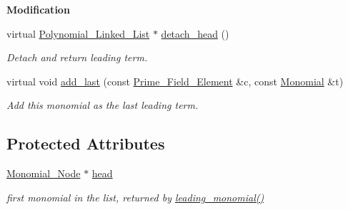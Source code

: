 \begin{Indent}\textbf{ Modification}\par
\begin{DoxyCompactItemize}
\item 
\mbox{\label{class_polynomial___linked___list_ad840ddaceb40cda7156a51a6882f9462}} 
virtual \hyperlink{class_polynomial___linked___list}{Polynomial\+\_\+\+Linked\+\_\+\+List} $\ast$ \hyperlink{class_polynomial___linked___list_ad840ddaceb40cda7156a51a6882f9462}{detach\+\_\+head} ()
\begin{DoxyCompactList}\small\item\em Detach and return leading term. \end{DoxyCompactList}\item 
\mbox{\label{class_polynomial___linked___list_a18b4928906ac8e5dafe3c93fe30dab61}} 
virtual void \hyperlink{class_polynomial___linked___list_a18b4928906ac8e5dafe3c93fe30dab61}{add\+\_\+last} (const \hyperlink{class_prime___field___element}{Prime\+\_\+\+Field\+\_\+\+Element} \&c, const \hyperlink{class_monomial}{Monomial} \&t)
\begin{DoxyCompactList}\small\item\em Add this monomial as the last leading term. \end{DoxyCompactList}\end{DoxyCompactItemize}
\end{Indent}
\subsection*{Protected Attributes}
\begin{DoxyCompactItemize}
\item 
\mbox{\label{class_polynomial___linked___list_a55c2905ab5c77fb51ff1c282ec3ce9e5}} 
\hyperlink{class_monomial___node}{Monomial\+\_\+\+Node} $\ast$ \hyperlink{class_polynomial___linked___list_a55c2905ab5c77fb51ff1c282ec3ce9e5}{head}
\begin{DoxyCompactList}\small\item\em first monomial in the list, returned by \hyperlink{class_polynomial___linked___list_aee580ed4521a6d4e630468a615e9f076}{leading\+\_\+monomial()} \end{DoxyCompactList}\end{DoxyCompactItemize}
